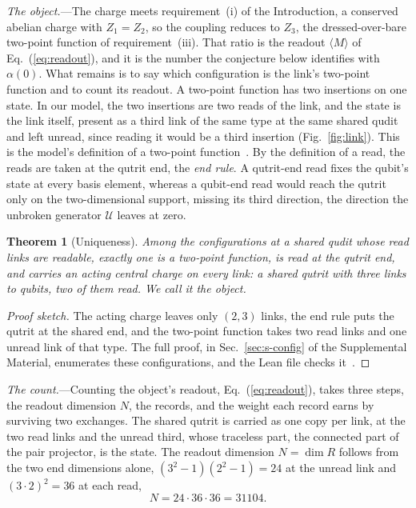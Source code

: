 \documentclass[aps,prl,reprint,superscriptaddress,longbibliography,nofootinbib,floatfix]{revtex4-2}
\newtheorem{theorem}{Theorem}
\theoremstyle{definition}
\begin{document}
\emph{The object.}---The charge meets requirement~(i) of the Introduction, a conserved abelian charge with $Z_{1}=Z_{2}$, so the coupling reduces to $Z_{3}$, the dressed-over-bare two-point function of requirement~(iii). That ratio is the readout $\langle M\rangle$ of Eq.~(\ref{eq:readout}), and it is the number the conjecture below identifies with $\alpha(0)$. What remains is to say which configuration is the link's two-point function and to count its readout. A two-point function has two insertions on one state. In our model, the two insertions are two reads of the link, and the state is the link itself, present as a third link of the same type at the same shared qudit and left unread, since reading it would be a third insertion (Fig.~\ref{fig:link}). This is the model's definition of a two-point function~\cite{SM}. By the definition of a read, the reads are taken at the qutrit end, the \emph{end rule}. A qutrit-end read fixes the qubit's state at every basis element, whereas a qubit-end read would reach the qutrit only on the two-dimensional support, missing its third direction, the direction the unbroken generator $\mathcal{U}$ leaves at zero.

\begin{theorem}[Uniqueness]
\label{thm:object}
Among the configurations at a shared qudit whose read links are readable, exactly one is a two-point function, is read at the qutrit end, and carries an acting central charge on every link: a shared qutrit with three links to qubits, two of them read. We call it the \emph{object}.
\end{theorem}

\begin{proof}[Proof sketch]
The acting charge leaves only $(2,3)$ links, the end rule puts the qutrit at the shared end, and the two-point function takes two read links and one unread link of that type. The full proof, in Sec.~\ref{sec:s-config} of the Supplemental Material, enumerates these configurations, and the Lean file checks it~\cite{SM}.
\end{proof}

\emph{The count.}---Counting the object's readout, Eq.~(\ref{eq:readout}), takes three steps, the readout dimension $N$, the records, and the weight each record earns by surviving two exchanges. The shared qutrit is carried as one copy per link, at the two read links and the unread third, whose traceless part, the connected part of the pair projector, is the state. The readout dimension $N=\dim R$ follows from the two end dimensions alone, $(3^{2}-1)(2^{2}-1)=24$ at the unread link and $(3\cdot 2)^{2}=36$ at each read,
\begin{equation}
N = 24\cdot 36\cdot 36 = 31104.
\label{eq:N}
\end{equation}
\end{document}
